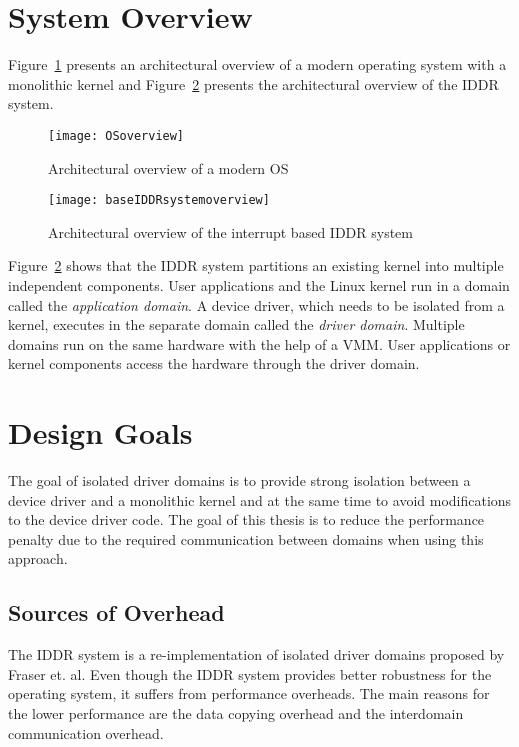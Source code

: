 \section{System Overview}\label{overview}

Figure~\ref{fig:monolithic} presents an architectural overview of a
modern operating system with a monolithic kernel and Figure~\ref{fig:base IDDR system overview} 
presents the architectural overview of the IDDR system.

\begin{figure}[!ht]
\centering
\texttt{[image: OSoverview]}
\caption{Architectural overview of a modern OS}
\label{fig:monolithic}
\end{figure}

\begin{figure}[!ht]
\centering
\texttt{[image: baseIDDRsystemoverview]}
\caption{Architectural overview of the interrupt based IDDR system}
\label{fig:base IDDR system overview}
\end{figure}

Figure~\ref{fig:base IDDR system overview} shows that the IDDR
system partitions an existing kernel into multiple independent
components.  User applications and the Linux kernel run in a domain
called the \textit{application domain}. A device driver, which needs
to be isolated from a kernel, executes in the separate domain called
the \textit{driver domain}. Multiple domains run on the same hardware
with the help of a VMM. User applications or kernel components access
the hardware through the driver domain.

\section{Design Goals}\label{sec:goals}
The goal of isolated driver domains is to provide strong isolation
between a device driver and a monolithic kernel and at the same time to
avoid modifications to the device driver code. The goal of this thesis
is to reduce the performance penalty due to the required communication 
between domains when using this approach.

\subsection*{Sources of Overhead}
The IDDR system is a re-implementation of isolated driver domains proposed
by Fraser et. al. Even though the IDDR system provides better robustness
for the operating system, it suffers from performance overheads. The
main reasons for the lower performance are the data copying overhead
and the interdomain communication overhead.

